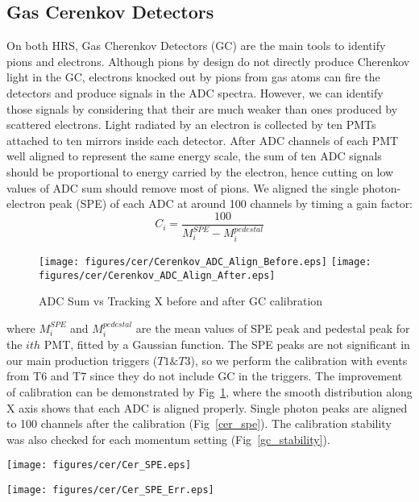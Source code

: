 
\subsection{Gas Cerenkov Detectors}

 On both HRS, Gas Cherenkov Detectors (GC) are the main tools to identify pions and electrons. Although pions by design do not directly produce Cherenkov light in the GC, electrons knocked out by pions from gas atoms can fire the detectors and produce signals in the ADC spectra. However, we can identify those signals by considering that their are much weaker than ones produced by scattered electrons. Light radiated by an electron is collected by ten PMTs attached to ten mirrors inside each detector. After ADC channels of each PMT well aligned to represent the same energy scale, the sum of ten ADC signals should be proportional to energy carried by the electron, hence cutting on low values of ADC sum should remove most of pions. We aligned the single photon-electron peak (SPE) of each ADC at around 100 channels by timing a gain factor:
\begin{equation}
 C_{i} = \frac{100}{M_{i}^{SPE}-M_{i}^{pedestal}}
\end{equation}

\begin{figure}[h!]
\texttt{[image: figures/cer/Cerenkov\_ADC\_Align\_Before.eps]}
\hfill
\texttt{[image: figures/cer/Cerenkov\_ADC\_Align\_After.eps]}
\caption{\footnotesize{ADC Sum vs Tracking X before and after GC calibration}}
\label{gc_x}
\end{figure}

 where $M_{i}^{SPE}$ and $M_{i}^{pedestal}$ are the mean values of SPE peak and pedestal peak for the $ith$ PMT, fitted by a Gaussian function. The SPE peaks are not significant in our main production triggers ($T1\&T3$), so we perform the calibration with events from T6 and T7 since they do not include GC in the triggers. The improvement of calibration can be demonstrated by Fig~\ref{gc_x}, where the smooth distribution along X axis shows that each ADC is aligned properly. Single photon peaks are aligned to 100 channels after the calibration (Fig~\ref{cer_spe}). The calibration stability was also checked for each momentum setting (Fig~\ref{gc_stability}).

\parbox[t]{0.4\textwidth}{
 \texttt{[image: figures/cer/Cer\_SPE.eps]}
 \label{cer_spe}
}
\hfill
\parbox[t]{0.5\textwidth}{
 \texttt{[image: figures/cer/Cer\_SPE\_Err.eps]}
 \label{gc_stability}
}
